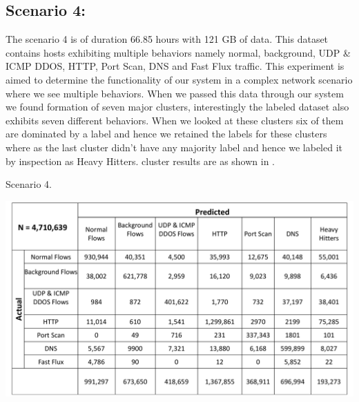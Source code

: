 \subsection{Scenario 4:}
The scenario 4 is of duration 66.85 hours with 121 GB of data. This dataset contains hosts exhibiting multiple behaviors namely normal, background, UDP \& ICMP DDOS, HTTP, Port Scan, DNS and Fast Flux traffic. This experiment is aimed to determine the functionality of our system in a complex network scenario where we see multiple behaviors. When we passed this data through our system we found formation of seven major clusters, interestingly the labeled dataset also exhibits seven different behaviors. When we looked at these clusters six of them are dominated by a label and hence we retained the labels for these clusters where as the last cluster didn't have any majority label and hence we labeled it by inspection as Heavy Hitters. cluster  results are as shown in .

\begin{table}[t]
	\caption{Scenario 4.}%
	\centerline{\includegraphics[scale = 0.5]{scenario4.pdf}}	
\end{table}

